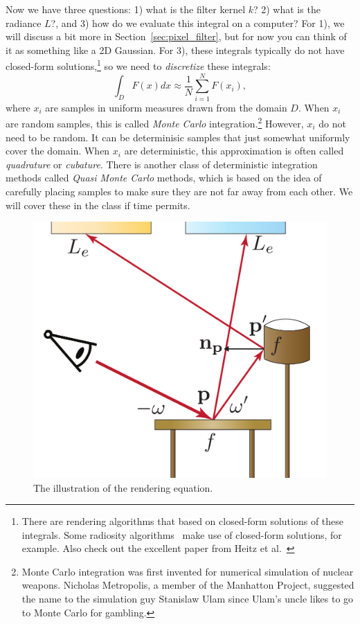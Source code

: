 \documentclass{article}
\begin{document}
Now we have three questions: 1) what is the filter kernel $k$? 2) what is the radiance $L$?, and 3) how do we evaluate this integral on a computer? For 1), we will discuss a bit more in Section~\ref{sec:pixel_filter}, but for now you can think of it as something like a 2D Gaussian. For 3), these integrals typically do not have closed-form solutions,\footnote{There are rendering algorithms that based on closed-form solutions of these integrals. Some radiosity algorithms~\cite{Schroder:1993:OFF} make use of closed-form solutions, for example. Also check out the excellent paper from Heitz et al.~\cite{Heitz:2016:RPS}} so we need to \emph{discretize} these integrals:
\begin{equation}
    \int_{D} F(x) dx \approx \frac{1}{N} \sum_{i=1}^{N} F(x_i),
    \label{eq:discretization}
\end{equation}
where $x_i$ are samples in uniform measures drawn from the domain $D$. When $x_i$ are random samples, this is called \emph{Monte Carlo} integration.\footnote{Monte Carlo integration was first invented for numerical simulation of nuclear weapons. Nicholas Metropolis, a member of the Manhatton Project, suggested the name to the simulation guy Stanislaw Ulam since Ulam's uncle likes to go to Monte Carlo for gambling.} However, $x_i$ do not need to be random. It can be determinisic samples that just somewhat uniformly cover the domain. When $x_i$ are deterministic, this approximation is often called \emph{quadrature} or \emph{cubature}. There is another class of deterministic integration methods called \emph{Quasi Monte Carlo} methods, which is based on the idea of carefully placing samples to make sure they are not far away from each other. We will cover these in the class if time permits.

\begin{figure}[h]
    \centering
    \includegraphics[width=0.4\linewidth]{imgs/pathtracing.pdf}
    \caption{The illustration of the rendering equation.}
    \label{fig:pathtracing}
\end{figure}
\end{document}

